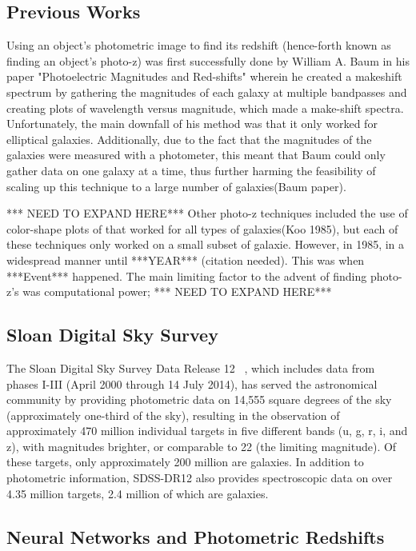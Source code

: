 \documentclass[fleqn,usenatbib]{mnras}
\begin{document}
\subsection{Previous Works}
 \label{sec:prev_work}
Using an object's photometric image to find its redshift (hence-forth known as finding an object's photo-z) was first successfully done by William A. Baum in his paper "Photoelectric Magnitudes and Red-shifts" wherein he created a makeshift spectrum by gathering the magnitudes of each galaxy at multiple bandpasses and creating plots of wavelength versus magnitude, which made a make-shift spectra.  Unfortunately, the main downfall of his method was that it only worked for elliptical galaxies.  Additionally, due to the fact that the magnitudes of the galaxies were measured with a photometer, this meant that Baum could only gather data on one galaxy at a time, thus further harming the feasibility of scaling up this technique to a large number of galaxies(Baum paper).

*** NEED TO EXPAND HERE***
Other photo-z techniques included the use of color-shape plots of that worked for all types of galaxies(Koo 1985), but each of these techniques only worked on a small subset of galaxie.  However, in 1985,   in a widespread manner until ***YEAR*** (citation needed).  This was when ***Event*** happened.  The main limiting factor to the advent of finding photo-z's was computational power; 
*** NEED TO EXPAND HERE***
 
\subsection{Sloan Digital Sky Survey}
  \label{sec:sdss}
The Sloan Digital Sky Survey Data Release 12 ~\citep[SDSS-DR12;][]{alam_DR12}, which includes data from phases I-III (April 2000 through 14 July 2014), has served the astronomical community by providing photometric data on 14,555 square degrees of the sky (approximately one-third of the sky), resulting in the observation of approximately 470 million individual targets in five different bands (u, g, r, i, and z), with magnitudes brighter, or comparable to 22 (the limiting magnitude). Of these targets, only approximately 200 million are galaxies.  In addition to photometric information, SDSS-DR12 also provides spectroscopic data on over 4.35 million targets, 2.4 million of which are galaxies.
  
\subsection{Neural Networks and Photometric Redshifts}
  \label{sec:nn_and_photoz}
\end{document}
